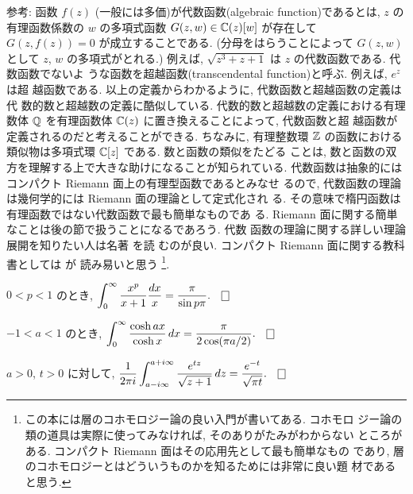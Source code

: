 \documentclass[12pt,twoside]{jarticle}
\begin{document}
\medskip

\noindent 参考: 函数 $f(z)$ (一般には多価)が代数函数(algebraic
function)であるとは, $z$ の有理函数係数の $w$ の多項式函数 %
$G(z,w)\in{\mathbb C}(z)[w]$ が存在して $G(z,f(z))=0$ が成立することである. %
(分母をはらうことによって $G(z,w)$ として $z$, $w$ の多項式がとれる.)
例えば, $\sqrt{z^3 + z + 1}$ は $z$ の代数函数である. 代数函数でないよ
うな函数を超越函数(transcendental function)と呼ぶ. 例えば, $e^z$ は超
越函数である. 以上の定義からわかるように, 代数函数と超越函数の定義は代
数的数と超越数の定義に酷似している. 代数的数と超越数の定義における有理
数体 ${\mathbb Q}$ を有理函数体 ${\mathbb C}(z)$ に置き換えることによって, 代数函数と超
越函数が定義されるのだと考えることができる. ちなみに, 有理整数環 ${\mathbb Z}$ %
の函数における類似物は多項式環 ${\mathbb C}[z]$ である. 数と函数の類似をたどる
ことは, 数と函数の双方を理解する上で大きな助けになることが知られている. 
代数函数は抽象的にはコンパクト Riemann 面上の有理型函数であるとみなせ
るので, 代数函数の理論は幾何学的には Riemann 面の理論として定式化され
る.  その意味で楕円函数は有理函数ではない代数函数で最も簡単なものであ
る. Riemann 面に関する簡単なことは後の節で扱うことになるであろう. 代数
函数の理論に関する詳しい理論展開を知りたい人は名著 \cite{Iwasawa} を読
むのが良い. コンパクト Riemann 面に関する教科書としては \cite{Gun} 
が
読み易いと思う%
\footnote{この本には層のコホモロジー論の良い入門が書いてある. コホモロ
  ジー論の類の道具は実際に使ってみなければ, そのありがたみがわからない
  ところがある. コンパクト Riemann 面はその応用先として最も簡単なもの
  であり, 層のコホモロジーとはどういうものかを知るためには非常に良い題
  材であると思う.}.

\begin{question}\label{q:sekibun-1}
  $0<p<1$ のとき, 
  \(\displaystyle
    \int_0^\infty \frac{x^p}{x+1} \frac{dx}{x}
    = \frac{\pi}{\sin p\pi}.
  \qed
  \)
\end{question}

\begin{question}\label{q:sekibun-2}
  $-1 < a < 1$ のとき, 
  \(\displaystyle
    \int_0^\infty \frac{\cosh ax}{\cosh x} \,dx
    = \frac{\pi}{2\cos(\pi a/2)}.
  \qed
  \)
\end{question}

\begin{question}\label{q:sekibun-3}
  $a>0$, $t>0$ に対して, 
  \(\displaystyle
    \frac{1}{2\pi i}
    \int_{a-i\infty}^{a+i\infty} \frac{e^{tz}}{\sqrt{z+1}}\,dz
    = \frac{e^{-t}}{\sqrt{\pi t}}.
    \qed
  \)
\end{question}
\end{document}
